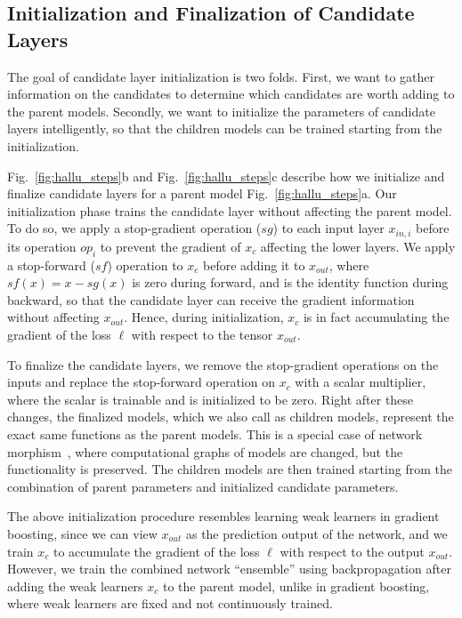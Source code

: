 \documentclass{article}
\begin{document}
\subsection{Initialization and Finalization of Candidate Layers}
\label{sec:hallu_init}

The goal of candidate layer initialization is two folds. First, we want to gather information on the candidates to determine which candidates are worth adding to the parent models. Secondly, we want to initialize the parameters of candidate layers intelligently, so that the children models can be trained starting from the initialization.

Fig.~\ref{fig:hallu_steps}b and Fig.~\ref{fig:hallu_steps}c describe how we initialize and finalize candidate layers for a parent model Fig.~\ref{fig:hallu_steps}a. 
Our initialization phase trains the candidate layer without affecting the parent model. 
To do so, we apply a stop-gradient operation ($sg$) to each input layer $x_{in,i}$ before its operation $op_i$ to prevent the gradient of $x_c$ affecting the lower layers. 
We apply a stop-forward ($sf$) operation to $x_c$ before adding it to $x_{out}$, where $sf(x) = x - sg(x)$ is zero during forward, and is the identity function during backward, so that the candidate layer can receive the gradient information without affecting $x_{out}$. Hence, during initialization, $x_c$ is in fact accumulating the gradient of the loss $\ell$ with respect to the tensor $x_{out}$. 


To finalize the candidate layers, we remove the stop-gradient operations on the inputs and replace the stop-forward operation on $x_c$ with a scalar multiplier, where the scalar is trainable and is initialized to be zero. Right after these changes, the finalized models, which we also call as children models, represent the exact same functions as the parent models. This is a special case of network morphism~\citep{netmorph}, where computational graphs of models are changed, but the functionality is preserved. The children models are then trained starting from the combination of parent parameters and initialized candidate parameters. 

The above initialization procedure resembles learning weak learners in gradient boosting, since we can view $x_{out}$ as the prediction output of the network, and we train $x_c$ to accumulate the gradient of the loss $\ell$ with respect to the output $x_{out}$. However, we train the combined network ``ensemble'' using backpropagation after adding the weak learners $x_c$ to the parent model, unlike in gradient boosting, where weak learners are fixed and not continuously trained. 
\end{document}

